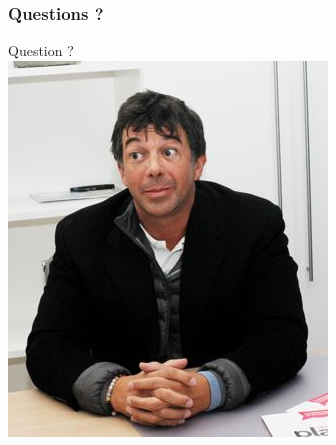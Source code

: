 \documentclass{beamer}
\begin{document}
\begin{frame}
  \frametitle{Questions ?}
  \begin{center}
    Question ? \\
    \includegraphics[scale=1.2]{../images/agent_immobilier.png}
  \end{center}
\end{frame}
\end{document}
